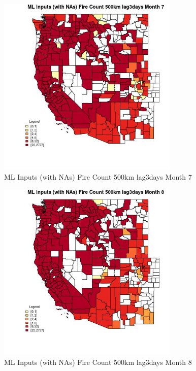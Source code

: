 \begin{figure} 
\centering  
\includegraphics[width=0.77\textwidth]{Code_Outputs/Report_ML_input_PM25_Step4_part_f_de_duplicated_aves_prioritize_24hr_obswNAs_CountyFire_Count_500km_lag3daysmedianMonth7.jpg} 
\caption{\label{fig:Report_ML_input_PM25_Step4_part_f_de_duplicated_aves_prioritize_24hr_obswNAsCountyFire_Count_500km_lag3daysmedianMonth7}ML Inputs (with NAs) Fire Count 500km lag3days Month 7} 
\end{figure} 
 

\begin{figure} 
\centering  
\includegraphics[width=0.77\textwidth]{Code_Outputs/Report_ML_input_PM25_Step4_part_f_de_duplicated_aves_prioritize_24hr_obswNAs_CountyFire_Count_500km_lag3daysmedianMonth8.jpg} 
\caption{\label{fig:Report_ML_input_PM25_Step4_part_f_de_duplicated_aves_prioritize_24hr_obswNAsCountyFire_Count_500km_lag3daysmedianMonth8}ML Inputs (with NAs) Fire Count 500km lag3days Month 8} 
\end{figure} 
 

